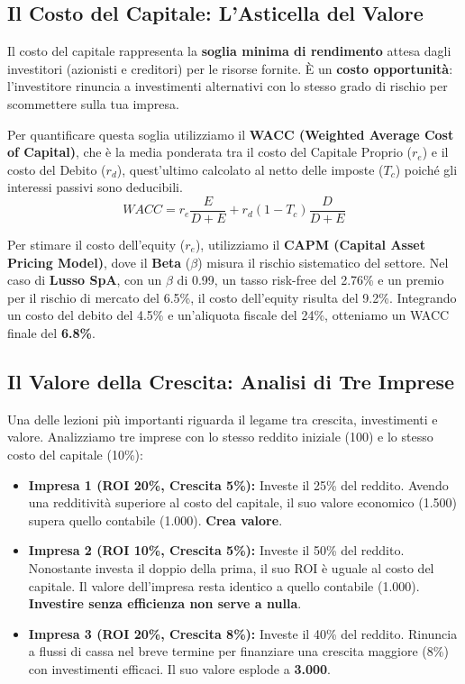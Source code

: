 \documentclass[a4paper,10pt]{article}
\begin{document}
\subsection*{Il Costo del Capitale: L'Asticella del Valore}

Il costo del capitale rappresenta la \textbf{soglia minima di rendimento} attesa dagli investitori (azionisti e creditori) per le risorse fornite. È un \textbf{costo opportunità}: l'investitore rinuncia a investimenti alternativi con lo stesso grado di rischio per scommettere sulla tua impresa.

Per quantificare questa soglia utilizziamo il \textbf{WACC (Weighted Average Cost of Capital)}, che è la media ponderata tra il costo del Capitale Proprio ($r_e$) e il costo del Debito ($r_d$), quest'ultimo calcolato al netto delle imposte ($T_c$) poiché gli interessi passivi sono deducibili.
\[ WACC = r_e \frac{E}{D+E} + r_d (1 - T_c) \frac{D}{D+E} \]

Per stimare il costo dell'equity ($r_e$), utilizziamo il \textbf{CAPM (Capital Asset Pricing Model)}, dove il \textbf{Beta} ($\beta$) misura il rischio sistematico del settore.
Nel caso di \textbf{Lusso SpA}, con un $\beta$ di 0.99, un tasso risk-free del 2.76\% e un premio per il rischio di mercato del 6.5\%, il costo dell'equity risulta del 9.2\%. Integrando un costo del debito del 4.5\% e un'aliquota fiscale del 24\%, otteniamo un WACC finale del \textbf{6.8\%}.

\subsection*{Il Valore della Crescita: Analisi di Tre Imprese}

Una delle lezioni più importanti riguarda il legame tra crescita, investimenti e valore. Analizziamo tre imprese con lo stesso reddito iniziale (100) e lo stesso costo del capitale (10\%):

\begin{itemize}
    \item \textbf{Impresa 1 (ROI 20\%, Crescita 5\%):} Investe il 25\% del reddito. Avendo una redditività superiore al costo del capitale, il suo valore economico (1.500) supera quello contabile (1.000). \textbf{Crea valore}.
    \item \textbf{Impresa 2 (ROI 10\%, Crescita 5\%):} Investe il 50\% del reddito. Nonostante investa il doppio della prima, il suo ROI è uguale al costo del capitale. Il valore dell'impresa resta identico a quello contabile (1.000). \textbf{Investire senza efficienza non serve a nulla}.
    \item \textbf{Impresa 3 (ROI 20\%, Crescita 8\%):} Investe il 40\% del reddito. Rinuncia a flussi di cassa nel breve termine per finanziare una crescita maggiore (8\%) con investimenti efficaci. Il suo valore esplode a \textbf{3.000}.
\end{itemize}
\end{document}
